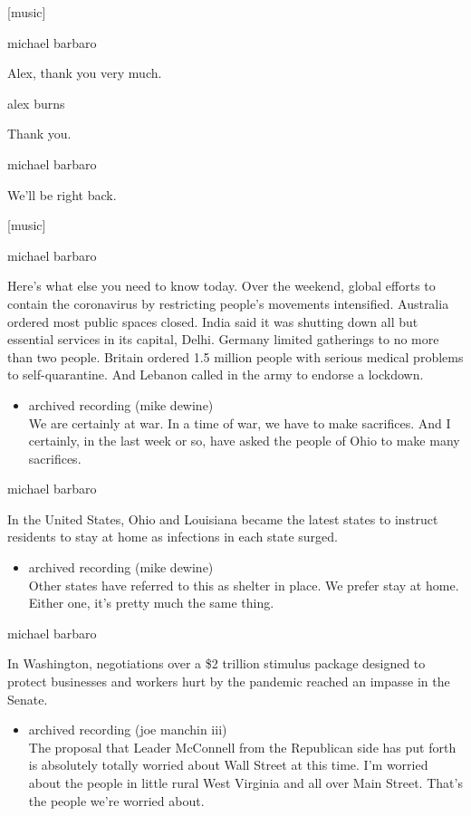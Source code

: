 {[}music{]}

michael barbaro

Alex, thank you very much.

alex burns

Thank you.

michael barbaro

We'll be right back.

{[}music{]}

michael barbaro

Here's what else you need to know today. Over the weekend, global
efforts to contain the coronavirus by restricting people's movements
intensified. Australia ordered most public spaces closed. India said it
was shutting down all but essential services in its capital, Delhi.
Germany limited gatherings to no more than two people. Britain ordered
1.5 million people with serious medical problems to self-quarantine. And
Lebanon called in the army to endorse a lockdown.

\begin{itemize}
\tightlist
\item
  archived recording (mike dewine)\\
  We are certainly at war. In a time of war, we have to make sacrifices.
  And I certainly, in the last week or so, have asked the people of Ohio
  to make many sacrifices.
\end{itemize}

michael barbaro

In the United States, Ohio and Louisiana became the latest states to
instruct residents to stay at home as infections in each state surged.

\begin{itemize}
\tightlist
\item
  archived recording (mike dewine)\\
  Other states have referred to this as shelter in place. We prefer stay
  at home. Either one, it's pretty much the same thing.
\end{itemize}

michael barbaro

In Washington, negotiations over a \$2 trillion stimulus package
designed to protect businesses and workers hurt by the pandemic reached
an impasse in the Senate.

\begin{itemize}
\tightlist
\item
  archived recording (joe manchin iii)\\
  The proposal that Leader McConnell from the Republican side has put
  forth is absolutely totally worried about Wall Street at this time.
  I'm worried about the people in little rural West Virginia and all
  over Main Street. That's the people we're worried about.
\end{itemize}

